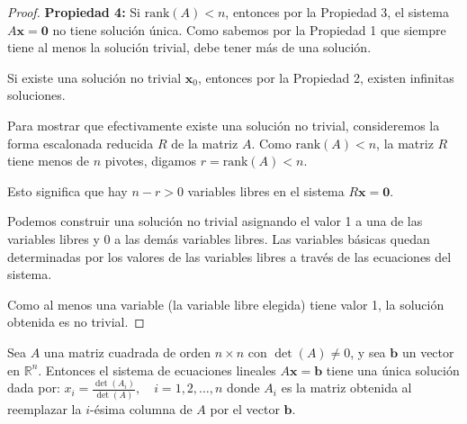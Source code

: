 \begin{proof}
\textbf{Propiedad 4:} Si $\text{rank}(A) < n$, entonces por la Propiedad 3, el sistema $A\mathbf{x} = \mathbf{0}$ no tiene solución única. Como sabemos por la Propiedad 1 que siempre tiene al menos la solución trivial, debe tener más de una solución.

Si existe una solución no trivial $\mathbf{x}_0$, entonces por la Propiedad 2, existen infinitas soluciones.

Para mostrar que efectivamente existe una solución no trivial, consideremos la forma escalonada reducida $R$ de la matriz $A$. Como $\text{rank}(A) < n$, la matriz $R$ tiene menos de $n$ pivotes, digamos $r = \text{rank}(A) < n$.

Esto significa que hay $n - r > 0$ variables libres en el sistema $R\mathbf{x} = \mathbf{0}$.

Podemos construir una solución no trivial asignando el valor 1 a una de las variables libres y 0 a las demás variables libres. Las variables básicas quedan determinadas por los valores de las variables libres a través de las ecuaciones del sistema.

Como al menos una variable (la variable libre elegida) tiene valor 1, la solución obtenida es no trivial.
\end{proof}

\begin{theorem}
Sea $A$ una matriz cuadrada de orden $n \times n$ con $\det(A) \neq 0$, y sea $\mathbf{b}$ un vector en $\mathbb{R}^n$. Entonces el sistema de ecuaciones lineales $A\mathbf{x} = \mathbf{b}$ tiene una única solución dada por:
$x_i = \frac{\det(A_i)}{\det(A)}, \quad i = 1, 2, \ldots, n$
donde $A_i$ es la matriz obtenida al reemplazar la $i$-ésima columna de $A$ por el vector $\mathbf{b}$.
\end{theorem}

